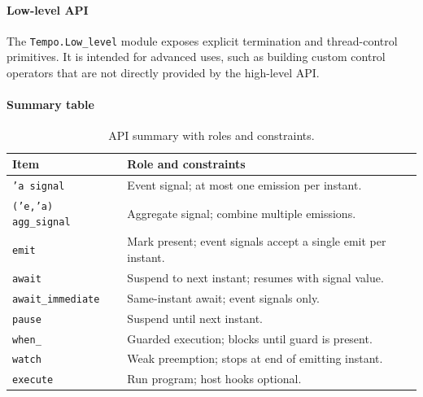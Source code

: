\paragraph{Low-level API}
The \texttt{Tempo.Low\_level} module exposes explicit termination and
thread-control primitives. It is intended for advanced uses, such as building
custom control operators that are not directly provided by the high-level API.

\paragraph{Summary table}
\begin{table}[h]
\centering
\begin{tabularx}{\linewidth}{lY}
\hline
Item & Role and constraints \\ \hline
\texttt{'a signal} & Event signal; at most one emission per instant. \\
\texttt{('e,'a) agg\_signal} & Aggregate signal; combine multiple emissions. \\
\texttt{emit} & Mark present; event signals accept a single emit per instant. \\
\texttt{await} & Suspend to next instant; resumes with signal value. \\
\texttt{await\_immediate} & Same-instant await; event signals only. \\
\texttt{pause} & Suspend until next instant. \\
\texttt{when\_} & Guarded execution; blocks until guard is present. \\
\texttt{watch} & Weak preemption; stops at end of emitting instant. \\
\texttt{execute} & Run program; host hooks optional. \\ \hline
\end{tabularx}
\caption{API summary with roles and constraints.}
\end{table}

